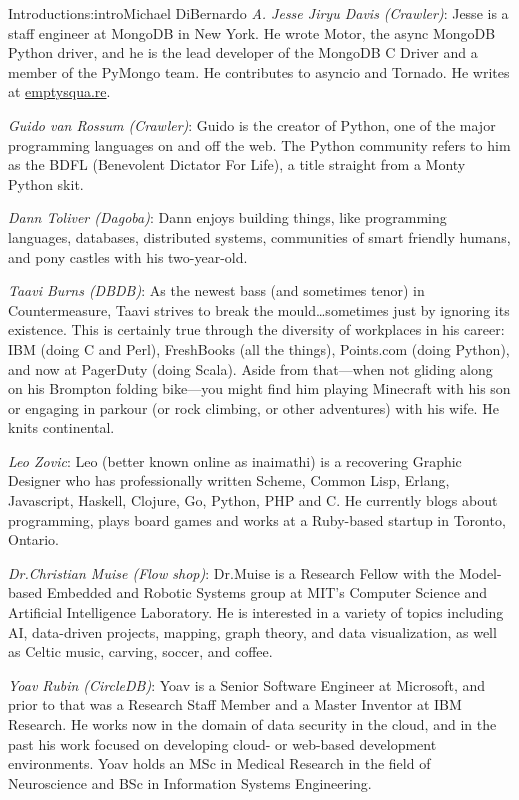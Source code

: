\begin{aosachapter}{Introduction}{s:intro}{Michael DiBernardo}
\emph{A. Jesse Jiryu Davis (Crawler)}: Jesse is a staff engineer at MongoDB in New York. He wrote Motor, the async MongoDB Python driver, and he is the lead developer of the MongoDB C Driver and a member of the PyMongo team. He contributes to asyncio and Tornado. He writes at \url{emptysqua.re}.

\emph{Guido van Rossum (Crawler)}: Guido is the creator of Python, one of the major programming languages on and off the web. The Python community refers to him as the BDFL (Benevolent Dictator For Life), a title straight from a Monty Python skit. 

\emph{Dann Toliver (Dagoba)}: Dann enjoys building things, like programming languages, databases, distributed systems, communities of smart friendly humans, and pony castles with his two-year-old.

\emph{Taavi Burns (DBDB)}: As the newest bass (and sometimes tenor) in Countermeasure, Taavi strives to break the mould\ldots sometimes just by ignoring its existence. This is certainly true through the diversity of workplaces in his career: IBM (doing C and Perl), FreshBooks (all the things), Points.com (doing Python), and now at PagerDuty (doing Scala).  Aside from that—when not gliding along on his Brompton folding bike—you might find him playing Minecraft with his son or engaging in parkour (or rock climbing, or other adventures) with his wife. He knits continental.

\emph{Leo Zovic}: Leo (better known online as inaimathi) is a recovering Graphic Designer who has professionally written Scheme, Common Lisp, Erlang, Javascript, Haskell, Clojure, Go, Python, PHP and C. He currently blogs about programming, plays board games and works at a Ruby-based startup in Toronto, Ontario.

\emph{Dr.\@ Christian Muise (Flow shop)}: Dr.\@ Muise is a Research Fellow with the Model-based Embedded and Robotic Systems group at MIT's Computer Science and Artificial Intelligence Laboratory. He is interested in a variety of topics including AI, data-driven projects, mapping, graph theory, and data visualization, as well as Celtic music, carving, soccer, and coffee.

\emph{Yoav Rubin (CircleDB)}: Yoav is a Senior Software Engineer at Microsoft, and prior to that was a Research Staff Member and a Master Inventor at IBM Research. He works now in the domain of data security in the cloud, and in the past his work focused on developing cloud- or web-based development environments. Yoav holds an MSc in Medical Research in the field of Neuroscience and BSc in Information Systems Engineering. 


\end{aosachapter}
